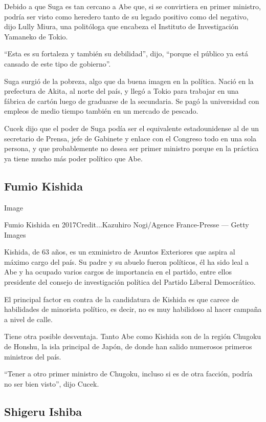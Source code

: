 Debido a que Suga es tan cercano a Abe que, si se convirtiera en primer
ministro, podría ser visto como heredero tanto de su legado positivo
como del negativo, dijo Lully Miura, una politóloga que encabeza el
Instituto de Investigación Yamaneko de Tokio.

``Esta es su fortaleza y también su debilidad'', dijo, ``porque el
público ya está cansado de este tipo de gobierno''.

Suga surgió de la pobreza, algo que da buena imagen en la política.
Nació en la prefectura de Akita, al norte del país, y llegó a Tokio para
trabajar en una fábrica de cartón luego de graduarse de la secundaria.
Se pagó la universidad con empleos de medio tiempo también en un mercado
de pescado.

Cucek dijo que el poder de Suga podía ser el equivalente estadounidense
al de un secretario de Prensa, jefe de Gabinete y enlace con el Congreso
todo en una sola persona, y que probablemente no desea ser primer
ministro porque en la práctica ya tiene mucho más poder político que
Abe.

\hypertarget{fumio-kishida}{%
\subsection{Fumio Kishida}\label{fumio-kishida}}

Image

Fumio Kishida en 2017Credit...Kazuhiro Nogi/Agence France-Presse ---
Getty Images

Kishida, de 63 años, es un exministro de Asuntos Exteriores que aspira
al máximo cargo del país. Su padre y su abuelo fueron políticos, él ha
sido leal a Abe y ha ocupado varios cargos de importancia en el partido,
entre ellos presidente del consejo de investigación política del Partido
Liberal Democrático.

El principal factor en contra de la candidatura de Kishida es que carece
de habilidades de minorista político, es decir, no es muy habilidoso al
hacer campaña a nivel de calle.

Tiene otra posible desventaja. Tanto Abe como Kishida son de la región
Chugoku de Honshu, la isla principal de Japón, de donde han salido
numerosos primeros ministros del país.

``Tener a otro primer ministro de Chugoku, incluso si es de otra
facción, podría no ser bien visto'', dijo Cucek.

\hypertarget{shigeru-ishiba}{%
\subsection{Shigeru Ishiba}\label{shigeru-ishiba}}

